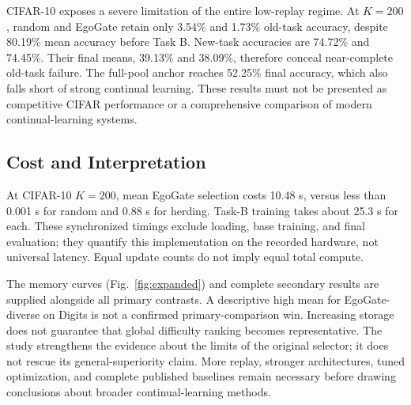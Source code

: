 CIFAR-10 exposes a severe limitation of the entire low-replay regime. At
$K=200$, random and EgoGate retain only 3.54\% and 1.73\% old-task accuracy,
despite 80.19\% mean accuracy before Task B. New-task accuracies are 74.72\%
and 74.45\%. Their final means, 39.13\% and 38.09\%, therefore conceal
near-complete old-task failure. The full-pool anchor reaches 52.25\% final
accuracy, which also falls short of strong continual learning. These results
must not be presented as competitive CIFAR performance or a comprehensive
comparison of modern continual-learning systems.

\subsection{Cost and Interpretation}
At CIFAR-10 $K=200$, mean EgoGate selection costs 10.48 s, versus less than
0.001 s for random and 0.88 s for herding. Task-B training takes about 25.3 s
for each. These synchronized timings exclude loading, base training, and final
evaluation; they quantify this implementation on the recorded hardware, not
universal latency. Equal update counts do not imply equal total compute.

The memory curves (Fig.~\ref{fig:expanded}) and complete secondary results
are supplied alongside all primary contrasts. A descriptive high mean for
EgoGate-diverse on Digits is not a confirmed primary-comparison win. Increasing
storage does not guarantee that global difficulty ranking becomes representative.
The study strengthens the evidence about the limits of the original selector;
it does not rescue its general-superiority claim. More replay, stronger
architectures, tuned optimization, and complete published baselines remain
necessary before drawing conclusions about broader continual-learning methods.
